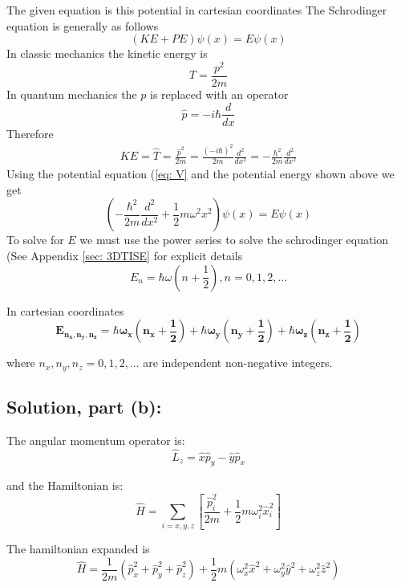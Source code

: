 \documentclass[12pt]{article}
\begin{document}
        The given equation is this potential in cartesian coordinates
        \newline The Schrodinger equation is generally as follows
        \[
            (KE + PE) \psi(x) = E \psi(x)
        \]
        In classic mechanics the kinetic energy is
        \[
            T = \frac{p^2}{2m}
        \]
        In quantum mechanics the $p$ is replaced with an operator
        \[
            \hat{p} = - i \hbar \frac{d}{dx}
        \]
        Therefore
        \begin{align*}
            KE = \hat{T} = \frac{\hat{p}^2}{2m} = \frac{(-i\hbar)^2}{2m} \frac{d^2}{dx^2} = -\frac{\hbar^2}{2m}  \frac{d^2}{dx^2}
        \end{align*}
        Using the potential equation (\ref{eq: V} and the potential energy shown above we get
        \[
            \left( - \frac{\hbar^2}{2 m} \frac{d^2}{dx^2} + \frac{1}{2} m \omega^2 x^2 \right) \psi(x) = E \psi(x)
        \]
        To solve for $E$ we must use the power series to solve the schrodinger equation (See Appendix \ref{sec: 3DTISE} for explicit details
        \[
            E_n = \hbar \omega \left( n + \frac{1}{2} \right),  n=0, 1, 2, \dots
        \]

        In cartesian coordinates
        \begin{equation}  \label{eq: E}
            \boldsymbol{\boxed{E_{n_x, n_y, n_z} = \hbar \omega_x \left(n_x + \frac{1}{2} \right) + \hbar \omega_y \left(n_y + \frac{1}{2} \right) + \hbar \omega_z \left(n_z + \frac{1}{2} \right)}}
        \end{equation}
        
        where \( n_x, n_y, n_z = 0, 1, 2, \dots \) are independent non-negative integers.
    
    \subsection{Solution, part (b):}
    
        The angular momentum operator is:
        \[
            \hat{L}_z = \hat{x} \hat{p}_y - \hat{y} \hat{p}_x
        \]
        
        and the Hamiltonian is:
        \[
            \hat{H} = \sum_{i = x, y, z} \left[ \frac{\hat{p}_i^2}{2m} + \frac{1}{2} m \omega_i^2 \hat{x}_i^2 \right]
        \]

        The hamiltonian expanded is 
        \[
            \hat{H} = \frac{1}{2m}\left( \hat{p}_x^2 + \hat{p}_y^2 + \hat{p}_z^2 \right) + \frac{1}{2}m\left( \omega_x^2 \hat{x}^2 + \omega_y^2 \hat{y}^2 + \omega_z^2 \hat{z}^2 \right)
        \]
\end{document}
